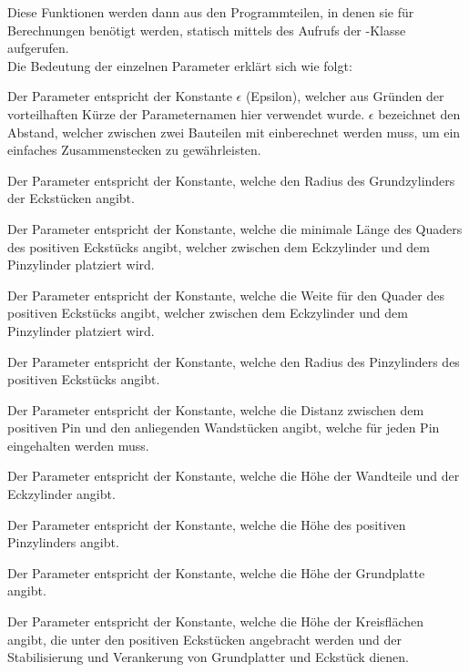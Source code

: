 Diese Funktionen werden dann aus den Programmteilen, in denen sie für Berechnungen benötigt werden, statisch mittels des Aufrufs der -Klasse aufgerufen. \\
Die Bedeutung der einzelnen Parameter erklärt sich wie folgt:
\begin{description}[style=nextline]
	\item[E ($\epsilon$/Epsilon)] 
		Der Parameter  entspricht der Konstante $\epsilon$ (Epsilon), welcher aus Gründen der vorteilhaften Kürze der Parameternamen hier verwendet wurde.
		$\epsilon$ bezeichnet den Abstand, welcher zwischen zwei Bauteilen mit einberechnet werden muss, um ein einfaches Zusammenstecken zu gewährleisten.
	\item[CornerRadius]
		Der Parameter  entspricht der Konstante, welche den Radius des Grundzylinders der Eckstücken angibt.
	\item[PinMinLength] 
		Der Parameter  entspricht der Konstante, welche die minimale Länge des Quaders des positiven Eckstücks angibt, welcher zwischen dem Eckzylinder und dem Pinzylinder platziert wird.
	\item[PinPWidth] 
		Der Parameter  entspricht der Konstante, welche die Weite für den Quader des positiven Eckstücks angibt, welcher zwischen dem Eckzylinder und dem Pinzylinder platziert wird.
	\item[PinPRadius] 
		Der Parameter  entspricht der Konstante, welche den Radius des Pinzylinders des positiven Eckstücks angibt.
	\item[PinDistance]
		Der Parameter  entspricht der Konstante, welche die Distanz zwischen dem positiven Pin und den anliegenden Wandstücken angibt, welche für jeden Pin eingehalten werden muss.
	\item[Height]
		Der Parameter  entspricht der Konstante, welche die Höhe der Wandteile und der Eckzylinder angibt.
	\item[PinHeight]
		Der Parameter  entspricht der Konstante, welche die Höhe des positiven Pinzylinders angibt.
	\item[BasePlateHeight]
		Der Parameter  entspricht der Konstante, welche die Höhe der Grundplatte angibt.
	\item[BasePlatePinCircleHeight]
		Der Parameter  entspricht der Konstante, welche die Höhe der Kreisflächen angibt, die unter den positiven Eckstücken angebracht werden und der Stabilisierung und Verankerung von Grundplatter und Eckstück dienen.
\end{description}

